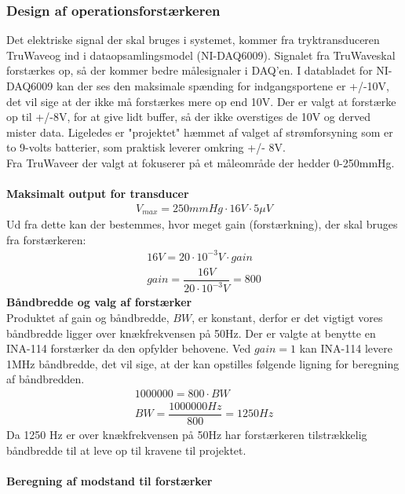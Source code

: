 \subsubsection{Design af operationsforstærkeren}
Det elektriske signal der skal bruges i systemet, kommer fra tryktransduceren TruWave\texttrademark og ind i dataopsamlingsmodel (NI-DAQ6009). Signalet fra TruWave\texttrademark skal forstærkes op, så der kommer bedre målesignaler i DAQ’en. I databladet for NI-DAQ6009 kan der ses den maksimale spænding for indgangsportene er +/-10V, det vil sige at der ikke må forstærkes mere op end 10V. Der er valgt at forstærke op til +/-8V, for at give lidt buffer, så der ikke overstiges de 10V og derved mister data. Ligeledes er "projektet" hæmmet af valget af strømforsyning som er to 9-volts batterier, som praktisk leverer omkring +/- 8V.\\ 
Fra TruWave\texttrademark er der valgt at fokuserer på et måleområde der hedder 0-250mmHg. \\\\
\textbf{Maksimalt output for transducer}\\
\begin{align}
V_{max}=250mmHg\cdot 16V\cdot 5\mu V 
\end{align}
Ud fra dette kan der bestemmes, hvor meget gain (forstærkning), der skal bruges fra forstærkeren:
\begin{align}
16V = 20\cdot 10^{-3}V\cdot gain\\
gain = \dfrac{16V}{20\cdot 10^{-3}V}=800
\end{align}
\textbf{Båndbredde og valg af forstærker}\\
Produktet af gain og båndbredde, $BW$, er konstant, derfor er det vigtigt vores båndbredde ligger over knækfrekvensen på 50Hz. Der er valgte at benytte en INA-114 forstærker da den opfylder behovene. Ved $gain=1$ kan INA-114 levere 1MHz båndbredde, det vil sige, at der kan opstilles følgende ligning for beregning af båndbredden.
\begin{align}
1000000 = 800\cdot BW\\
BW = \dfrac{1000000Hz}{800}=1250Hz
\end{align}
Da 1250 Hz er over knækfrekvensen på 50Hz har forstærkeren tilstrækkelig båndbredde til at leve op til kravene til projektet.\\\\
\textbf{Beregning af modstand til forstærker}\\
